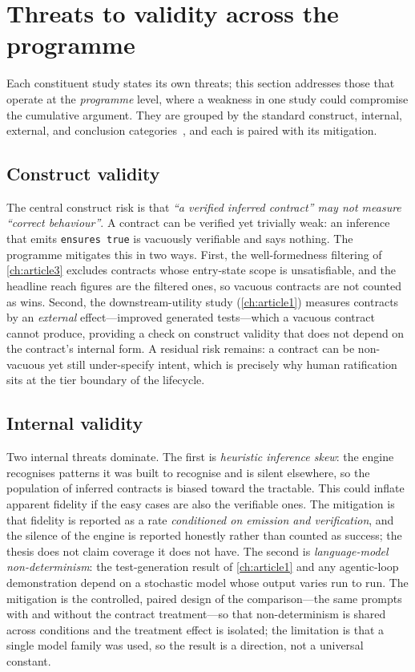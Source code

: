 \section{Threats to validity across the programme}

Each constituent study states its own threats; this section addresses those that
operate at the \emph{programme} level, where a weakness in one study could
compromise the cumulative argument. They are grouped by the standard construct,
internal, external, and conclusion categories~\citep{runeson2009casestudy,yin2018case},
and each is paired with its mitigation.

\subsection{Construct validity}

The central construct risk is that \emph{``a verified inferred contract'' may not
measure ``correct behaviour''}. A contract can be verified yet trivially weak: an
inference that emits \texttt{ensures true} is vacuously verifiable and says nothing.
The programme mitigates this in two ways. First, the well-formedness filtering of
\cref{ch:article3} excludes contracts whose entry-state scope is unsatisfiable, and
the headline reach figures are the filtered ones, so vacuous contracts are not
counted as wins. Second, the downstream-utility study (\cref{ch:article1}) measures
contracts by an \emph{external} effect---improved generated tests---which a vacuous
contract cannot produce, providing a check on construct validity that does not
depend on the contract's internal form. A residual risk remains: a contract can be
non-vacuous yet still under-specify intent, which is precisely why human
ratification sits at the tier boundary of the lifecycle.

\subsection{Internal validity}

Two internal threats dominate. The first is \emph{heuristic inference skew}: the
engine recognises patterns it was built to recognise and is silent elsewhere, so
the population of inferred contracts is biased toward the tractable. This could
inflate apparent fidelity if the easy cases are also the verifiable ones. The
mitigation is that fidelity is reported as a rate \emph{conditioned on emission and
verification}, and the silence of the engine is reported honestly rather than
counted as success; the thesis does not claim coverage it does not have. The second
is \emph{language-model non-determinism}: the test-generation result of
\cref{ch:article1} and any agentic-loop demonstration depend on a stochastic model
whose output varies run to run. The mitigation is the controlled, paired design of
the comparison---the same prompts with and without the contract treatment---so that
non-determinism is shared across conditions and the treatment effect is isolated;
the limitation is that a single model family was used, so the result is a direction,
not a universal constant.

